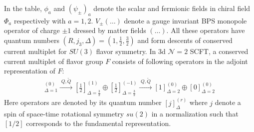 \documentclass[a4paper,11pt]{article}
\def\cN{\mathcal{N}}
\begin{document}
%
In the table,  $\phi_a$ and $(\psi_{\pm})_a$ denote the scalar and fermionic fields in chiral field $\Phi_{a}$ respectively with $a=1,2$.  $V_\pm (\ldots)$ denote a gauge invariant BPS monopole operator of charge $
\pm 1$ dressed by matter fields $(\ldots)$.  %
 All these operators have quantum numbers $(R,j_3,\Delta)= (1, \frac{1}2, \frac{3}2)$ and form descents of conserved current multiplet for $SU(3)$ flavor symmetry.  In 3d $\cN=2$ SCFT, a conserved current multiplet of flavor group $F$ consists of following operators in the adjoint representation of $F$:
 \begin{align}
 [0]^{(0)}_{\Delta=1} \xrightarrow[\text{}]{\; Q,\tilde{Q}\; } [\frac{1}2]^{(1)}_{\Delta = \frac{3}2} \oplus [\frac{1}2]^{(-1)}_{\Delta = \frac{3}2} \xrightarrow[\text{}]{\; Q,\tilde{Q}\; }  [1]^{(0)}_{\Delta=2} \oplus [0]^{(0)}_{\Delta=2}
 \end{align}
 Here operators are denoted by its quantum number $[j]^{(r)}_{\Delta}$ where $j$ denote a spin of space-time rotational symmetry $su(2)$ in a normalization such that $[1/2]$ corresponds to the fundamental representation. 
\end{document}
